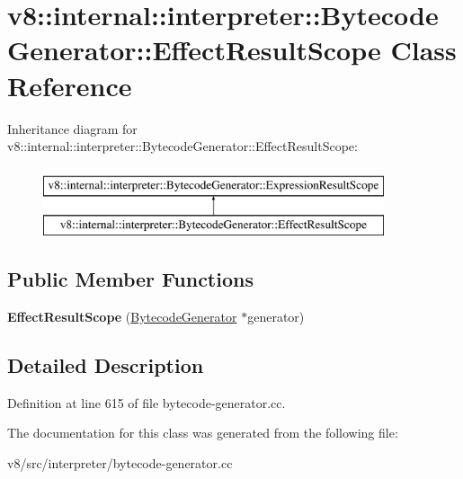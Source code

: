 \hypertarget{classv8_1_1internal_1_1interpreter_1_1BytecodeGenerator_1_1EffectResultScope}{}\section{v8\+:\+:internal\+:\+:interpreter\+:\+:Bytecode\+Generator\+:\+:Effect\+Result\+Scope Class Reference}
\label{classv8_1_1internal_1_1interpreter_1_1BytecodeGenerator_1_1EffectResultScope}
Inheritance diagram for v8\+:\+:internal\+:\+:interpreter\+:\+:Bytecode\+Generator\+:\+:Effect\+Result\+Scope\+:\begin{figure}[H]
\begin{center}
\leavevmode
\includegraphics[height=2.000000cm]{classv8_1_1internal_1_1interpreter_1_1BytecodeGenerator_1_1EffectResultScope}
\end{center}
\end{figure}
\subsection*{Public Member Functions}
\begin{DoxyCompactItemize}
\item 
\mbox{\label{classv8_1_1internal_1_1interpreter_1_1BytecodeGenerator_1_1EffectResultScope_a08e55be62b1fb53c8fc1525ed1d408ce}} 
{\bfseries Effect\+Result\+Scope} (\mbox{\hyperlink{classv8_1_1internal_1_1interpreter_1_1BytecodeGenerator}{Bytecode\+Generator}} $\ast$generator)
\end{DoxyCompactItemize}


\subsection{Detailed Description}


Definition at line 615 of file bytecode-\/generator.\+cc.



The documentation for this class was generated from the following file\+:\begin{DoxyCompactItemize}
\item 
v8/src/interpreter/bytecode-\/generator.\+cc\end{DoxyCompactItemize}

